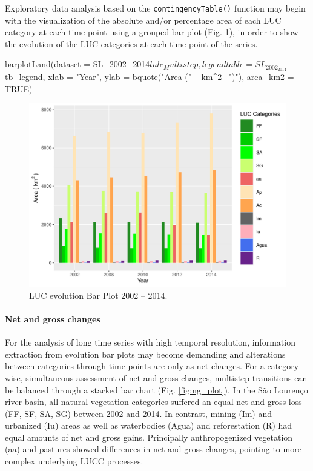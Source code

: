 Exploratory data analysis based on the \texttt{contingencyTable()}
function may begin with the visualization of the absolute and/or
percentage area of each LUC category at each time point using a grouped
bar plot (Fig. \ref{fig:evolution_plot}), in order to show the evolution
of the LUC categories at each time point of the series.

\begin{Schunk}
\begin{Sinput}
barplotLand(dataset = SL_2002_2014$lulc_Multistep, 
            legendtable = SL_2002_2014$tb_legend,
            xlab = "Year",
            ylab = bquote("Area (" ~ km^2~ ")"),
            area_km2 = TRUE)
\end{Sinput}
\begin{figure}[htbp]

{\centering \includegraphics[width=0.7\linewidth,]{figures/barplotLand.pdf} 

}

\caption[LUC evolution Bar Plot 2002 – 2014]{LUC evolution Bar Plot 2002 – 2014.}\label{fig:evolution_plot}
\end{figure}
\end{Schunk}

\hypertarget{net-and-gross-changes}{%
\paragraph{Net and gross changes}\label{net-and-gross-changes}}

For the analysis of long time series with high temporal resolution,
information extraction from evolution bar plots may become demanding and
alterations between categories through time points are only as net
changes. For a category-wise, simultaneous assessment of net and gross
changes, multistep transitions can be balanced through a stacked bar
chart (Fig. \ref{fig:ng_plot}). In the São Lourenço river basin, all
natural vegetation categories suffered an equal net and gross loss (FF,
SF, SA, SG) between 2002 and 2014. In contrast, mining (Im) and
urbanized (Iu) areas as well as waterbodies (Agua) and reforestation (R)
had equal amounts of net and gross gains. Principally anthropogenized
vegetation (aa) and pastures showed differences in net and gross
changes, pointing to more complex underlying LUCC processes.

